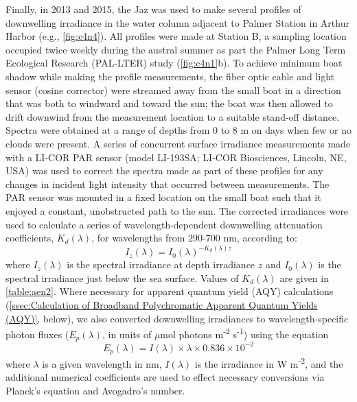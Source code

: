 Finally, in 2013 and 2015, the Jaz was used to make several profiles of downwelling irradiance in the water column adjacent to Palmer Station in Arthur Harbor (e.g., \autoref{fig:c4n4}). All profiles were made at Station B, a sampling location occupied twice weekly during the austral summer as part the Palmer Long Term Ecological Research (PAL-LTER) study (\autoref{fig:c4n1}b). To achieve minimum boat shadow while making the profile measurements, the fiber optic cable and light sensor (cosine corrector) were streamed away from the small boat in a direction that was both to windward and toward the sun; the boat was then allowed to drift downwind from the measurement location to a suitable stand-off distance. Spectra were obtained at a range of depths from 0 to 8 m on days when few or no clouds were present. A series of concurrent surface irradiance measurements made with a LI-COR PAR sensor (model LI-193SA; LI-COR Biosciences, Lincoln, NE, USA) was used to correct the spectra made as part of these profiles for any changes in incident light intensity that occurred between measurements. The PAR sensor was mounted in a fixed location on the small boat such that it enjoyed a constant, unobstructed path to the sun. The corrected irradiances were used to calculate a series of wavelength-dependent downwelling attenuation coefficients, ${K_d}(\lambda )$, for wavelengths from 290-700 nm, according to:
\begin{equation} \label{eq:c4e1}
{I_z}(\lambda ) = {I_0}{(\lambda )^{ - {K_d}(\lambda )z}}
\end{equation}
where ${I_z}(\lambda )$ is the spectral irradiance at depth irradiance $z$ and ${I_0}(\lambda )$ is the spectral irradiance just below the sea surface. Values of ${K_d}(\lambda )$ are given in \autoref{table:aen2}. Where necessary for apparent quantum yield (AQY) calculations (\autoref{ssec:Calculation of Broadband Polychromatic Apparent Quantum Yields (AQY)}, below), we also converted downwelling irradiances to wavelength-specific photon fluxes (${E_p}(\lambda )$, in units of $\mu$mol photons m\textsuperscript{-2} s\textsuperscript{-1}) using the equation
\begin{equation} \label{eq:c4e2}
{E_p}(\lambda ) = I(\lambda ) \times \lambda  \times 0.836 \times {10^{ - 2}}
\end{equation}
where $\lambda$ is a given wavelength in nm, ${I}(\lambda )$ is the irradiance in W m\textsuperscript{-2}, and the additional numerical coefficients are used to effect necessary conversions via Planck's equation and Avogadro's number.
